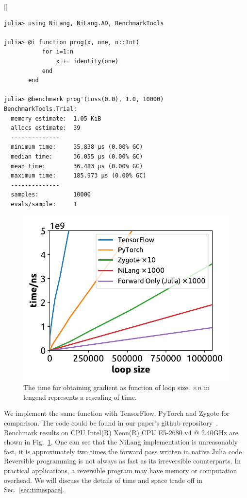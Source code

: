 \documentclass[aps,twocolumn,longbibliography,english,superscriptaddress]{revtex4-1}
\newcommand{\<}{\langle}
\renewcommand{\>}{\rangle}
\newcommand{\Fig}[1]{Fig.~\ref{#1}}
\newcommand{\Sec}[1]{Sec.~\ref{#1}}
\newcommand{\blue}[1]{[{\bf  \color{blue}{JG: #1}}]}
\theoremstyle{definition}\newtheorem{definition}{\textit{Definition}}
\begin{document}
\blue{Grammarly here!}

\begin{minipage}{.44\textwidth}
\begin{lstlisting}
julia> using NiLang, NiLang.AD, BenchmarkTools

julia> @i function prog(x, one, n::Int)
           for i=1:n
               x += identity(one)
           end
       end

julia> @benchmark prog'(Loss(0.0), 1.0, 10000)
BenchmarkTools.Trial: 
  memory estimate:  1.05 KiB
  allocs estimate:  39
  --------------
  minimum time:     35.838 μs (0.00% GC)
  median time:      36.055 μs (0.00% GC)
  mean time:        36.483 μs (0.00% GC)
  maximum time:     185.973 μs (0.00% GC)
  --------------
  samples:          10000
  evals/sample:     1
\end{lstlisting}
\end{minipage}

\begin{figure}
    \centerline{\includegraphics[width=0.9\columnwidth,trim={0 0cm 0 0},clip]{images/fig3.pdf}}
    \caption{The time for obtaining gradient as function of loop size. $\times n$ in lengend represents a rescaling of time.}\label{fig:benchmark}
\end{figure}
We implement the same function with TensorFlow, PyTorch and Zygote for comparison. The code could be found in our paper's github repository~\cite{benchmark}. Benchmark results on CPU Intel(R) Xeon(R) CPU E5-2680 v4 @ 2.40GHz are shown in \Fig{fig:benchmark}.
One can see that the NiLang implementation is unreasonably fast, it is approximately two times the forward pass written in native Julia code.
Reversible programming is not always as fast as its irreversible counterparts. In practical applications, a reversible program may have memory or computation overhead. We will discuss the details of time and space trade off in \Sec{sec:timespace}.
\end{document}
